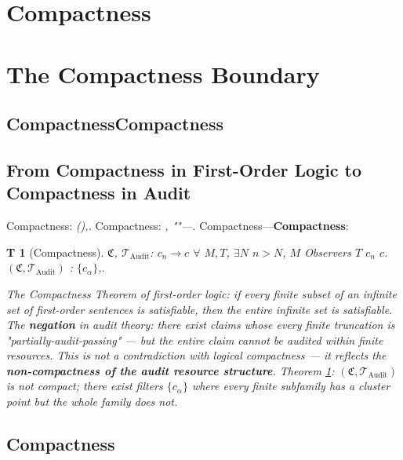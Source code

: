 \documentclass[12pt,a4paper]{article}
\theoremstyle{plain}
\newtheorem{theorem}Theorem[section]
\theoremstyle{definition}
\theoremstyle{remark}
\newcommand{\T}{\mathcal{T}}
\newcommand{\ClaimSpace}{\mathfrak{C}}
\DeclareMathOperator{\Audit}{Audit}
\begin{document}
\section{Compactness}
\section{The Compactness Boundary}
\subsection{CompactnessCompactness}
\subsection{From Compactness in First-Order Logic to Compactness in Audit}
Compactness: \textit{(),.}
Compactness: \textit{, ""---.}
Compactness---\textbf{Compactness}: 
\vspace{4pt}
\begin{theorem}[Compactness]\label{thm:audit_noncompact}
 $\ClaimSpace$, $\T_{\Audit}$: $c_n \to c$ $\forall$ $M, T$, $\exists N$ $n > N$, $M$ Observers $T$ $c_n$ $c$.
 $(\ClaimSpace, \T_{\Audit})$ : $\{c_\alpha\}$,.
\end{theorem}
\vspace{4pt}
\noindent
\textit{The Compactness Theorem of first-order logic: if every finite subset of an infinite set of first-order sentences is satisfiable, then the entire infinite set is satisfiable. The \textbf{negation} in audit theory: there exist claims whose every finite truncation is "partially-audit-passing" --- but the entire claim cannot be audited within finite resources. This is not a contradiction with logical compactness --- it reflects the \textbf{non-compactness of the audit resource structure}. Theorem \ref{thm:audit_noncompact}: $(\ClaimSpace, \T_{\Audit})$ is not compact; there exist filters $\{c_\alpha\}$ where every finite subfamily has a cluster point but the whole family does not.}
\subsection{Compactness}
\end{document}
